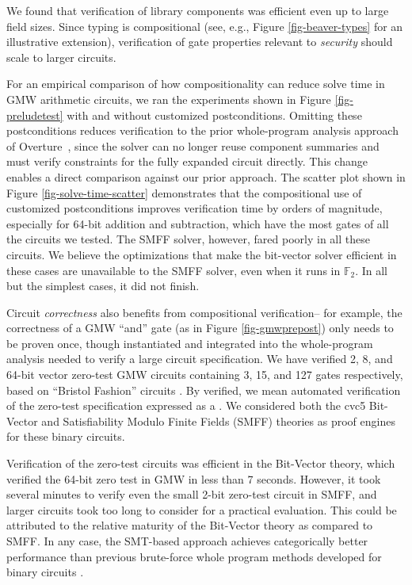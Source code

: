 \preludetestfig

We found that verification of library components was efficient even up to large
field sizes. Since typing is compositional (see, e.g., Figure
\ref{fig-beaver-types} for an illustrative extension), verification of gate
properties relevant to \emph{security} should scale to larger circuits.

For an empirical comparison of how compositionality can reduce solve time in
GMW arithmetic circuits, we ran the experiments shown in Figure
\ref{fig-preludetest} with and without customized postconditions. Omitting
these postconditions reduces verification to the prior whole-program analysis
approach of Overture~\cite{skalka-near-ppdp24}, since the solver can no longer reuse component summaries
and must verify constraints for the fully expanded circuit directly.
%
This change enables a direct comparison against our prior approach.
%
The
scatter plot shown in Figure \ref{fig-solve-time-scatter} demonstrates that the
compositional use of customized postconditions improves verification time by
orders of magnitude, especially for 64-bit addition and subtraction, which have
the most gates of all the circuits we tested. The SMFF solver, however, fared
poorly in all these circuits. We believe the optimizations that make the
bit-vector solver efficient in these cases are unavailable to the SMFF solver,
even when it runs in $\mathbb{F}_2$. In all but the simplest cases, it did
not finish.

\solvetimescatterfig

Circuit \emph{correctness} also benefits from compositional
verification-- for example, the correctness of a GMW ``and'' gate (as
in Figure \ref{fig-gmwprepost}) only needs to be proven once, though
instantiated and integrated into the whole-program analysis needed to
verify a large circuit specification. We have verified 2, 8, and
64-bit vector zero-test GMW circuits containing 3, 15, and 127 gates
respectively, based on ``Bristol Fashion'' circuits \cite{bristol}. By
verified, we mean automated verification of the zero-test
specification expressed as a . We considered both
the cvc5 Bit-Vector and Satisfiability Modulo Finite Fields (SMFF)
theories as proof engines for these binary circuits.

Verification of the zero-test circuits was efficient in the Bit-Vector
theory, which verified the 64-bit zero test in GMW in less than 7
seconds. However, it took several minutes to verify even the small
2-bit zero-test circuit in SMFF, and larger circuits took too long to
consider for a practical evaluation. This could be attributed to the
relative maturity of the Bit-Vector theory as compared to SMFF.  In
any case, the SMT-based approach achieves categorically better
performance than previous brute-force whole program methods developed for binary
circuits \cite{skalka-near-ppdp24}.

